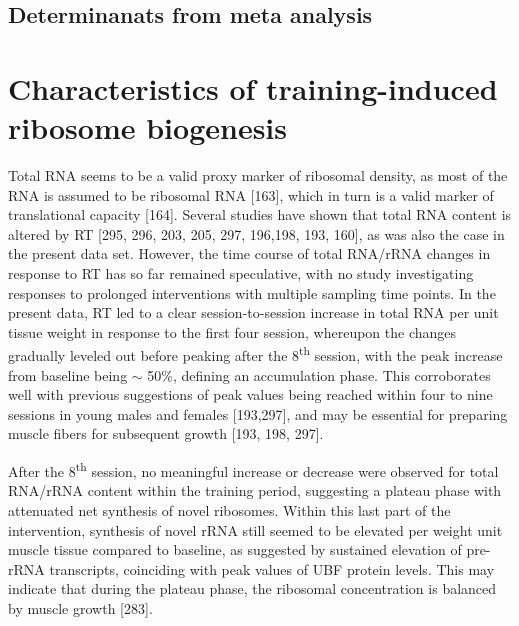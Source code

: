 \documentclass[twoside,10pt]{gihclass} %
\begin{document}
\hypertarget{determinanats-from-meta-analysis}{%
\subsection{Determinanats from meta analysis}\label{determinanats-from-meta-analysis}}

\hypertarget{characteristics-of-training-induced-ribosome-biogenesis}{%
\section{Characteristics of training-induced ribosome biogenesis}\label{characteristics-of-training-induced-ribosome-biogenesis}}

Total RNA seems to be a valid proxy marker of ribosomal density, as most of the RNA is assumed to be ribosomal RNA
{[}163{]},
which in turn is a valid marker of translational capacity
{[}164{]}.
Several studies have shown that total RNA content is altered by RT
{[}295, 296, 203, 205, 297, 196,198, 193, 160{]},
as was also the case in the present data set.
However, the time course of total RNA/rRNA changes in response to RT has so far remained speculative, with no study investigating responses to prolonged interventions with multiple sampling time points.
In the present data, RT led to a clear session-to-session increase in total RNA per unit tissue weight in response to the first four session, whereupon the changes gradually leveled out before peaking after the 8\textsuperscript{th} session, with the peak increase from baseline being \(\sim\) 50\%, defining an accumulation phase.
This corroborates well with previous suggestions of peak values being reached within four to nine sessions in young males and females
{[}193,297{]}, and may be essential for preparing muscle fibers for subsequent growth
{[}193, 198, 297{]}.

After the 8\textsuperscript{th} session, no meaningful increase or decrease were observed for total RNA/rRNA content within the training period, suggesting a plateau phase with attenuated net synthesis of novel ribosomes. Within this last part of the intervention, synthesis of novel rRNA still seemed to be elevated per weight unit muscle tissue compared to baseline, as suggested by sustained elevation of pre-rRNA transcripts, coinciding with peak values of UBF protein levels. This may indicate that during the plateau phase, the ribosomal concentration is balanced by muscle growth {[}283{]}.
\end{document}
